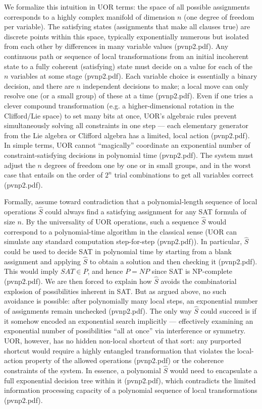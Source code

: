 \documentclass[11pt]{article}
\begin{document}
We formalize this intuition in UOR terms: the space of all possible assignments corresponds to a highly complex manifold of dimension \(n\) (one degree of freedom per variable). The satisfying states (assignments that make all clauses true) are discrete points within this space, typically exponentially numerous but isolated from each other by differences in many variable values (pvnp2.pdf). Any continuous path or sequence of local transformations from an initial incoherent state to a fully coherent (satisfying) state must decide on a value for each of the \(n\) variables at some stage (pvnp2.pdf). Each variable choice is essentially a binary decision, and there are \(n\) independent decisions to make; a local move can only resolve one (or a small group) of these at a time (pvnp2.pdf). Even if one tries a clever compound transformation (e.g. a higher-dimensional rotation in the Clifford/Lie space) to set many bits at once, UOR’s algebraic rules prevent simultaneously solving all constraints in one step --- each elementary generator from the Lie algebra or Clifford algebra has a limited, local action (pvnp2.pdf). In simple terms, UOR cannot “magically” coordinate an exponential number of constraint-satisfying decisions in polynomial time (pvnp2.pdf). The system must adjust the \(n\) degrees of freedom one by one or in small groups, and in the worst case that entails on the order of \(2^n\) trial combinations to get all variables correct (pvnp2.pdf).

Formally, assume toward contradiction that a polynomial-length sequence of local operations \(\hat S\) could always find a satisfying assignment for any SAT formula of size \(n\). By the universality of UOR operations, such a sequence \(\hat S\) would correspond to a polynomial-time algorithm in the classical sense (UOR can simulate any standard computation step-for-step (pvnp2.pdf)). In particular, \(\hat S\) could be used to decide SAT in polynomial time by starting from a blank assignment and applying \(\hat S\) to obtain a solution and then checking it (pvnp2.pdf). This would imply \(\mathit{SAT} \in P\), and hence \(P = NP\) since SAT is NP-complete (pvnp2.pdf). We are then forced to explain how \(\hat S\) avoids the combinatorial explosion of possibilities inherent in SAT. But as argued above, no such avoidance is possible: after polynomially many local steps, an exponential number of assignments remain unchecked (pvnp2.pdf). The only way \(\hat S\) could succeed is if it somehow encoded an exponential search implicitly --- effectively examining an exponential number of possibilities “all at once” via interference or symmetry. UOR, however, has no hidden non-local shortcut of that sort: any purported shortcut would require a highly entangled transformation that violates the local-action property of the allowed operations (pvnp2.pdf) or the coherence constraints of the system. In essence, a polynomial \(\hat S\) would need to encapsulate a full exponential decision tree within it (pvnp2.pdf), which contradicts the limited information processing capacity of a polynomial sequence of local transformations (pvnp2.pdf).
\end{document}
